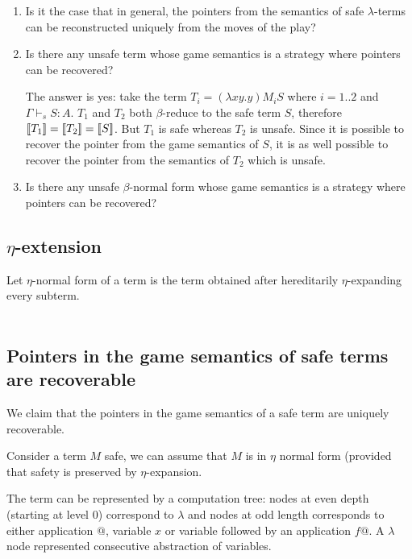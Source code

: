 \begin{enumerate}
\item
Is it the case that in general, the pointers from the semantics of
safe $\lambda$-terms can be reconstructed uniquely from the moves of
the play?


\item
Is there any unsafe term whose game semantics is a strategy where
pointers can be recovered?

The answer is yes: take the term $T_i = (\lambda x y . y) M_i S$
where $i =1..2$ and $\Gamma \vdash_s S : A$. $T_1$ and $T_2$ both
$\beta$-reduce to the safe term $S$, therefore
${[\![ T_1 ]\!]}={[\![ T_2 ]\!]}={[\![ S ]\!]}$. But $T_1$ is safe whereas $T_2$ is
unsafe. Since it is possible to recover the pointer from the game
semantics of $S$, it is as well possible to recover the pointer from
the semantics of $T_2$ which is unsafe.

\item
Is there any unsafe $\beta$-normal form whose game semantics is a
strategy where pointers can be recovered?


\end{enumerate}


\subsection{$\eta$-extension}

Let $\eta$-normal form of a term is the term obtained after
hereditarily $\eta$-expanding every subterm.

\def\etanfaux#1{\lceil#1 \rceil}
\def\etanf#1{\eta-nf\left( #1 \right)}

\begin{eqnarray*}
\end{eqnarray*}

\subsection{Pointers in the game semantics of safe terms are recoverable}

We claim that the pointers in the game semantics of a safe term are
uniquely recoverable.

Consider a term $M$ safe, we can assume that $M$ is in $\eta$ normal
form (provided that safety is preserved by $\eta$-expansion.

The term can be represented by a computation tree: nodes at even
depth (starting at level 0) correspond to $\lambda$ and nodes at odd
length corresponds to either application $@$, variable $x$ or
variable followed by an application $f@$. A $\lambda$ node
represented consecutive abstraction of variables.

